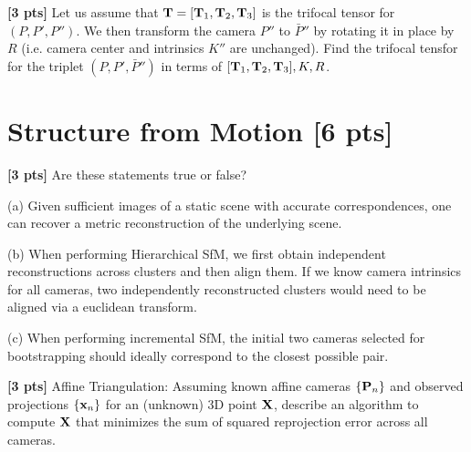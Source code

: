 \documentclass[11pt,addpoints,answers]{exam}
\numberwithin{equation}{section} %
\numberwithin{figure}{section} %
\numberwithin{table}{section} %
\begin{document}
\begin{questions}
\begin{tcolorbox}[fit,height=2cm, width=\textwidth, blank, borderline={0.5pt}{-2pt},halign=left, valign=center, nobeforeafter]


\end{tcolorbox}

\question \textbf{[3 pts]} Let us assume that $\mathbf{T} = [\mathbf{T}_1, \mathbf{T}_2, \mathbf{T}_3]$ is the trifocal tensor for $(P, P', P'')$. We then transform the camera $P''$ to $\bar{P}''$ by rotating it in place by $R$ (i.e. camera center and intrinsics $K''$ are unchanged). Find the trifocal tensfor for the triplet $(P, P', \bar{P}'')$ in terms of $ [\mathbf{T}_1, \mathbf{T}_2, \mathbf{T}_3], K, R$.

\begin{tcolorbox}[fit,height=4cm, width=\textwidth, blank, borderline={0.5pt}{-2pt},halign=left, valign=center, nobeforeafter]


\end{tcolorbox}

\section{Structure from Motion [6 pts]}

\question \textbf{[3 pts]} Are these statements true or false?  

(a) Given sufficient images of a static scene with accurate correspondences, one can recover a metric reconstruction of the underlying scene.

(b) When performing Hierarchical SfM, we first obtain independent reconstructions across clusters and then align them. If we know camera intrinsics for all cameras, two independently reconstructed clusters would need to be aligned via a euclidean transform.

(c) When performing incremental SfM, the initial two cameras selected for bootstrapping should ideally correspond to the closest possible pair.

\begin{tcolorbox}[fit,height=3cm, width=\textwidth, blank, borderline={0.5pt}{-2pt},halign=left, valign=center, nobeforeafter]


\end{tcolorbox}

\newpage

\question \textbf{[3 pts]} Affine Triangulation: Assuming known affine cameras $\{\mathbf{P}_n\}$ and observed projections $\{\mathbf{x}_n\}$ for an (unknown) 3D point $\mathbf{X}$, describe an algorithm to compute $\mathbf{X}$ that minimizes the sum of squared reprojection error across all cameras.

\begin{tcolorbox}[fit,height=6cm, width=\textwidth, blank, borderline={0.5pt}{-2pt},halign=left, valign=center, nobeforeafter]


\end{tcolorbox}


\end{questions}
\end{document}
